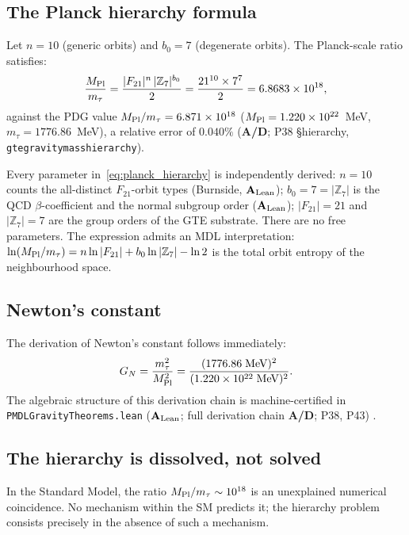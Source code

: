 \documentclass[11pt,openany]{book}
\theoremstyle{remark}
\newcommand{\ZS}{\mathbb{Z}_7}
\newcommand{\lean}[1]{%
  \penalty-100
  \begingroup\def\_{\textunderscore\allowbreak}\texttt{#1}\endgroup}
\newcommand{\mtau}{m_\tau}
\newcommand{\MPl}{M_{\rm Pl}}
\newcommand{\GN}{G_N}
\newcommand{\CMCA}{\text{CMCA}}
\newcommand{\CatAL}{\ensuremath{\textbf{A}_{\rm Lean}}}
\newcommand{\CatAD}{\textbf{A/D}}
\begin{document}
\subsection*{The Planck hierarchy formula}

Let $n = 10$ (generic orbits) and $b_0 = 7$ (degenerate orbits).
The Planck-scale ratio satisfies:
\begin{equation}
  \frac{\MPl}{\mtau}
  = \frac{|F_{21}|^n\,|\ZS|^{b_0}}{2}
  = \frac{21^{10}\times 7^7}{2}
  = 6.8683\times10^{18},
  \label{eq:planck_hierarchy}
\end{equation}
against the PDG value $\MPl/\mtau = 6.871\times10^{18}$
($\MPl = 1.220\times10^{22}$~MeV, $\mtau = 1776.86$~MeV),
a relative error of $\mathbf{0.040\%}$
(\CatAD; P38 \S hierarchy, \lean{gte\_gravity\_mass\_hierarchy}).

Every parameter in~\eqref{eq:planck_hierarchy} is independently derived:
$n = 10$ counts the all-distinct $F_{21}$-orbit types (Burnside, \CatAL);
$b_0 = 7 = |\ZS|$ is the QCD $\beta$-coefficient and the normal subgroup order
(\CatAL);
$|F_{21}| = 21$ and $|\ZS| = 7$ are the group orders of the GTE substrate.
There are no free parameters.
The expression admits an MDL interpretation: $\ln(\MPl/\mtau) = n\ln|F_{21}| +
b_0\ln|\ZS| - \ln 2$ is the total orbit entropy of the \CMCA{} neighbourhood space.

\subsection*{Newton's constant}

The derivation of Newton's constant follows immediately:
\begin{equation}
  \GN = \frac{\mtau^2}{\MPl^2}
      = \frac{(1776.86\;\text{MeV})^2}{(1.220\times10^{22}\;\text{MeV})^2}.
  \label{eq:GN}
\end{equation}
The algebraic structure of this derivation chain is machine-certified in
\lean{PMDLGravityTheorems.lean} (\CatAL; full derivation chain \CatAD; P38, P43) \cite{SpivackPhiMDLGravity}.

\subsection*{The hierarchy is dissolved, not solved}

In the Standard Model, the ratio $\MPl/\mtau \sim 10^{18}$ is an unexplained
numerical coincidence.
No mechanism within the SM predicts it; the hierarchy problem consists precisely
in the absence of such a mechanism.
\end{document}
